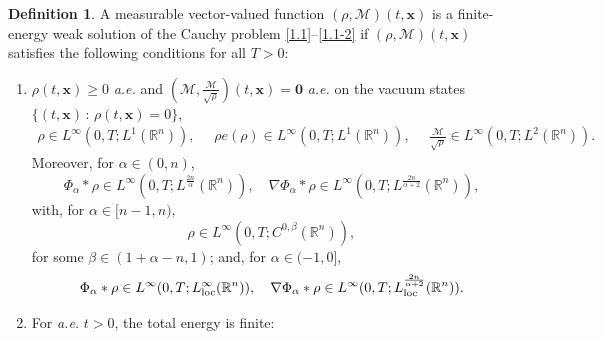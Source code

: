 \documentclass[reqno,11pt]{amsart}
\numberwithin{equation}{section}
\theoremstyle{definition}
\newtheorem{definition}[theorem]{Definition}
\def\M{{\mathcal{M}}}
\begin{document}
\begin{definition}\label{definition}
A measurable vector-valued function $(\rho,\M)(t, \boldsymbol{x})$ is a finite-energy weak solution 
of the Cauchy problem \eqref{1.1}--\eqref{1.1-2} if
$(\rho,\M)(t, \boldsymbol{x})$ satisfies the following conditions for all $T>0${\rm :}
\begin{enumerate}
\item[(a)] $\rho(t,\boldsymbol{x}) \geq 0$ {\it a.e.} and $(\M, \frac{\M}{\sqrt{\rho}})(t,\boldsymbol{x}) = \boldsymbol{0}$ {\it a.e.} on the vacuum states $\{ (t,\boldsymbol{x}) \, : \, \rho(t,\boldsymbol{x}) = 0 \}$,
\begin{align*}
\rho\in L^{\infty}(0,T; L^1(\mathbb{R}^n)), \quad \,\, 
\rho e(\rho)\in L^{\infty}(0,T; L^1(\mathbb{R}^n)), \quad\,\,
 \frac{\M}{\sqrt{\rho}}\in L^{\infty}(0,T; L^2(\mathbb{R}^n)).
    \end{align*}
 Moreover, for $\alpha \in (0,n)$,
    \[
\Phi_\alpha * \rho\in L^\infty(0,T;L^{\frac{2n}{\alpha}}(\mathbb{R}^n) ),\quad
\nabla\Phi_\alpha * \rho\in L^\infty(0,T;L^{\frac{2n}{\alpha + 2}}(\mathbb{R}^n)),
  \]
 with, for $\alpha \in [n-1,n)$,
 \[
 \rho \in L^\infty(0,T;C^{0,\beta}(\mathbb{R}^n)),
  \]
    for some $\beta \in (1 + \alpha - n,1)$; and, for $\alpha \in (-1,0]$,
    \[
 \Phi_\alpha * \rho\in L^\infty(0,T;L^\infty_{\rm loc}(\mathbb{R}^n) ),\quad
\nabla\Phi_\alpha * \rho\in L^\infty(0,T;L_{\rm loc}^{\frac{2n}{\alpha + 2}}(\mathbb{R}^n)).
 \]
\item[(b)] For {\it a.e.} $t>0$, the total energy is finite{\rm :}


\end{enumerate}
\end{definition}
\end{document}
